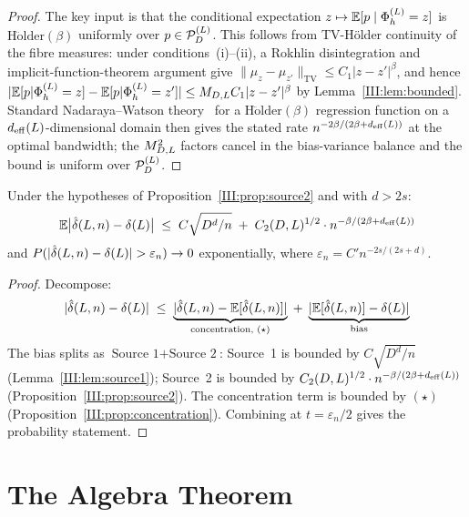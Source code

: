 \begin{proof}
The key input is that the conditional expectation $z \mapsto \mathbb{E}[p \mid \Phi_h^{(L)} = z]$
is $\mathrm{H\ddot{o}lder}(\beta)$ uniformly over $p \in \mathcal{P}_D^{(L)}$.
This follows from TV-Hölder continuity of the fibre measures:
under conditions~(i)--(ii), a Rokhlin disintegration and implicit-function-theorem
argument give $\|\mu_z - \mu_{z'}\|_{\mathrm{TV}} \leq C_1|z-z'|^\beta$,
and hence $|\mathbb{E}[p|\Phi_h^{(L)}=z] - \mathbb{E}[p|\Phi_h^{(L)}=z']| \leq M_{D,L} C_1|z-z'|^\beta$
by Lemma~\ref{III:lem:bounded}.
Standard Nadaraya--Watson theory~\cite{Gyorfi2002} for a $\mathrm{H\ddot{o}lder}(\beta)$
regression function on a $d_{\mathrm{eff}}(L)$-dimensional domain then gives the stated rate
$n^{-2\beta/(2\beta+d_{\mathrm{eff}}(L))}$ at the optimal bandwidth; the $M_{D,L}^2$ factors
cancel in the bias-variance balance and the bound is uniform over $\mathcal{P}_D^{(L)}$.
\end{proof}
\fi

\begin{theorem}
\label{III:thm:convergence}
Under the hypotheses of Proposition~\ref{III:prop:source2} and with $d > 2s$:
\[
  \mathbb{E}\bigl|\hat{\delta}(L,n) - \delta(L)\bigr|
  \;\leq\;
  C\sqrt{D^d/n}
  \;+\; C_2(D,L)^{1/2} \cdot n^{-\beta/(2\beta+d_{\mathrm{eff}}(L))}
\]
and $P(|\hat{\delta}(L,n) - \delta(L)| > \varepsilon_n) \to 0$ exponentially,
where $\varepsilon_n = C' n^{-2s/(2s+d)}$.
\end{theorem}

\begin{proof}
Decompose:
\[
  |\hat{\delta}(L,n) - \delta(L)|
  \;\leq\;
  \underbrace{|\hat{\delta}(L,n) - \mathbb{E}[\hat{\delta}(L,n)]|}_{\text{concentration, }(\star)}
  \;+\;
  \underbrace{|\mathbb{E}[\hat{\delta}(L,n)] - \delta(L)|}_{\text{bias}}
\]
The bias splits as $\text{Source~1} + \text{Source~2}$:
Source~1 is bounded by $C\sqrt{D^d/n}$ (Lemma~\ref{III:lem:source1});
Source~2 is bounded by $C_2(D,L)^{1/2} \cdot n^{-\beta/(2\beta+d_{\mathrm{eff}}(L))}$
(Proposition~\ref{III:prop:source2}).
The concentration term is bounded by $(\star)$ (Proposition~\ref{III:prop:concentration}).
Combining at $t = \varepsilon_n/2$ gives the probability statement.
\end{proof}

\section{The Algebra Theorem}
\label{III:sec:algebra}

